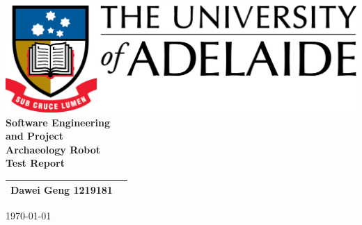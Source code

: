 \begin{center}
\includegraphics[scale=1.5]{./UniLogo}\\[3cm]    
\textbf{\Huge \bfseries Software Engineering \\ and Project}\\[2.5cm]



\textbf{\huge Archaeology Robot}\\[0.5cm]
\textbf{ \huge Test Report }\\[2cm]



\begin{tabular}{ |c | p{2cm} |}
	\hline
Dawei Geng 1219181 & \\[.5cm] \hline
\end{tabular}


\vfill

{\large \today}

\end{center}

